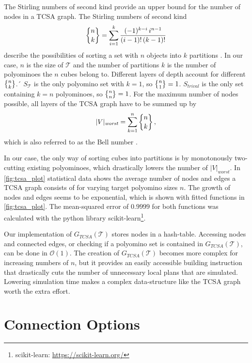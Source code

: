 The Stirling numbers of second kind provide an upper bound for the number of nodes in a TCSA graph.
The Stirling numbers of second kind
\begin{equation}
\bracenom{n}{k} = \sum_{i=1}^{k} \frac{(-1)^{k-i} \, i^{n-1}}{(i-1)! \, (k-1)!}
\end{equation}
describe the possibilities of sorting a set with $n$ objects into $k$ partitions \cite{jelliss1991}.
In our case, $n$ is the size of $\mathcal{T}$ and the number of partitions $k$ is the number of polyominoes the $n$ cubes belong to.
Different layers of depth account for different $\bracenom{n}{k}$.´
$S_\mathcal{T}$ is the only polyomino set with $k=1$, so $\bracenom{n}{1} = 1$.
$S_\textit{trival}$ is the only set containing $k=n$ polyominoes, so $\bracenom{n}{n} = 1$.
For the maximum number of nodes possible, all layers of the TCSA graph have to be summed up by
\begin{equation}
|V|_\textit{worst} = \sum_{k=1}^{n} \bracenom{n}{k} \, ,
\end{equation}
which is also referred to as the Bell number \cite{jelliss1991}.

In our case, the only way of sorting cubes into partitions is by monotonously two-cutting existing polyominoes, which drastically lowers the number of $|V|_\textit{worst}$.
In \autoref{fig:tcsa_plot} statistical data shows the average number of nodes and edges a TCSA graph consists of for varying target polyomino sizes $n$.
The growth of nodes and edges seems to be exponential, which is shown with fitted functions in \autoref{fig:tcsa_plot}.
The mean-squared error of $0.9999$ for both functions was calculated with the python library scikit-learn\footnote{scikit-learn: \url{https://scikit-learn.org/}}.

Our implementation of $G_{\textit{TCSA}}(\mathcal{T})$ stores nodes in a hash-table.
Accessing nodes and connected edges, or checking if a polyomino set is contained in $G_{\textit{TCSA}}(\mathcal{T})$, can be done in  $\mathcal{O}(1)$.
The creation of $G_{\textit{TCSA}}(\mathcal{T})$ becomes more complex for increasing numbers of $n$, but it provides an easily accessible building instruction that drastically cuts the number of unnecessary local plans that are simulated.
Lowering simulation time makes a complex data-structure like the TCSA graph worth the extra effort.


\section{Connection Options}
\label{sec:connect_options}

